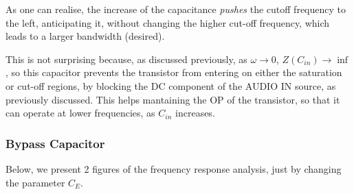 \pagebreak

As one can realise, the increase of the capacitance \textit{pushes} the cutoff frequency to the left, anticipating it, without changing the higher cut-off frequency, which leads to a larger bandwidth (desired).

This is not surprising because, as discussed previously, as $\omega \to 0$, $Z(C_{in}) \to \inf$, so this capacitor prevents the transistor from entering on either the saturation or cut-off regions, by blocking the DC component of the AUDIO IN source, as previously discussed. This helps mantaining the OP of the transistor, so that it can operate at lower frequencies, as $C_{in}$ increases.

\subsubsection{Bypass Capacitor}

Below, we present 2 figures of the frequency response analysis, just by changing the parameter $C_E$.

